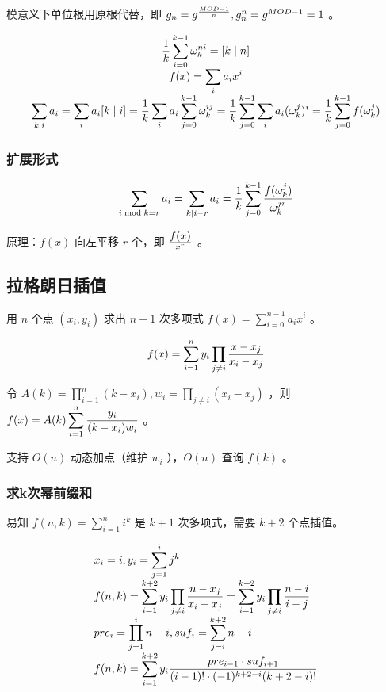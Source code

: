 模意义下单位根用原根代替，即 $g_n=g^{MOD-1\over n},g_n^n=g^{MOD-1}=1$ 。

$$
\begin{array}{c}
\displaystyle
{1\over k}\sum_{i=0}^{k-1}\omega_{k}^{ni}=[k\mid n]\\
\displaystyle
f(x)=\sum_{i}a_ix^i\\
\displaystyle
\sum_{k\mid i}a_i=\sum_{i}a_i[k\mid i]={1\over k}\sum_{i}a_i\sum_{j=0}^{k-1}\omega_{k}^{ij}={1\over k}\sum_{j=0}^{k-1}\sum_{i}a_i(\omega_{k}^{j})^i={1\over k}\sum_{j=0}^{k-1}f(\omega_{k}^{j})
\end{array}
$$

\subsubsection{扩展形式}

$$
\sum_{i\bmod k=r}a_i=\sum_{k|i-r}a_i={1\over k}\sum_{j=0}^{k-1}{f(\omega_k^j)\over\omega_k^{jr}}
$$

原理：$f(x)$ 向左平移 $r$ 个，即 $\displaystyle f(x)\over x^r$ 。

\newpage


\subsection{拉格朗日插值}

用 $n$ 个点 $(x_i,y_i)$ 求出 $n-1$ 次多项式 $f(x)=\sum_{i=0}^{n-1}a_ix^i$ 。

$$
f(x)=\sum_{i=1}^{n}y_i\prod_{j\not=i}{x-x_j\over x_i-x_j}
$$

令 $A(k)=\prod_{i=1}^{n}(k-x_i),w_i=\prod_{j\not=i}(x_i-x_j)$ ，则 $\displaystyle f(x)=A(k)\sum_{i=1}^{n}{y_i\over (k-x_i)w_i}$ 。

支持 $O(n)$ 动态加点（维护 $w_i$ ），$O(n)$ 查询 $f(k)$ 。

\subsubsection{求k次幂前缀和}

易知 $f(n,k)=\sum_{i=1}^{n}i^k$ 是 $k+1$ 次多项式，需要 $k+2$ 个点插值。

$$
\begin{array}{l}
\displaystyle
x_i=i,y_i=\sum_{j=1}^{i}j^k\\
\displaystyle
f(n,k)=\sum_{i=1}^{k+2}y_i\prod_{j\not=i}{n-x_j\over x_i-x_j}=\sum_{i=1}^{k+2}y_i\prod_{j\not=i}{n-i\over i-j}\\
\displaystyle
pre_i=\prod_{j=1}^{i}n-i,suf_i=\sum_{j=i}^{k+2}n-i\\
\displaystyle
f(n,k)=\sum_{i=1}^{k+2}y_i{pre_{i-1}\cdot suf_{i+1}\over (i-1)!\cdot (-1)^{k+2-i}(k+2-i)!}
\end{array}
$$

